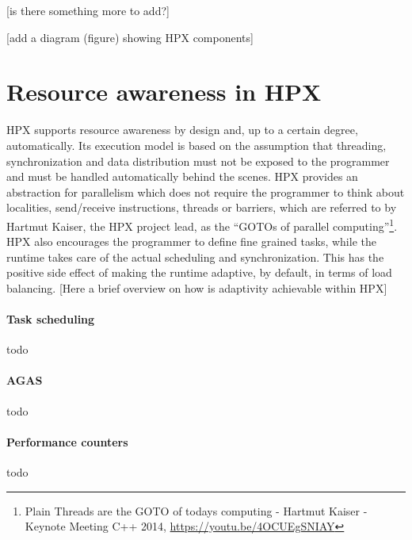 [\TODO is there something more to add?]

[\TODO add a diagram (figure) showing HPX components]

\section{Resource awareness in HPX}
HPX supports resource awareness by design and, up to a certain degree, automatically.
Its execution model is based on the assumption that threading, synchronization and data distribution must not be exposed to the programmer and must be handled automatically behind the scenes. HPX provides an abstraction for parallelism which does not require the programmer to think about localities, send/receive instructions, threads or barriers, which are referred to by Hartmut Kaiser, the HPX project lead, as the ``GOTOs of parallel computing''\footnote{Plain Threads are the GOTO of todays computing - Hartmut Kaiser - Keynote Meeting C++ 2014, \url{https://youtu.be/4OCUEgSNIAY}}. HPX also encourages the programmer to define fine grained tasks, while the runtime takes care of the actual scheduling and synchronization. This has the positive side effect of making the runtime adaptive, by default, in terms of load balancing.
[\TODO Here a brief overview on how is adaptivity achievable within HPX]

\paragraph{Task scheduling}
todo

\paragraph{AGAS}
todo

\paragraph{Performance counters}
todo

